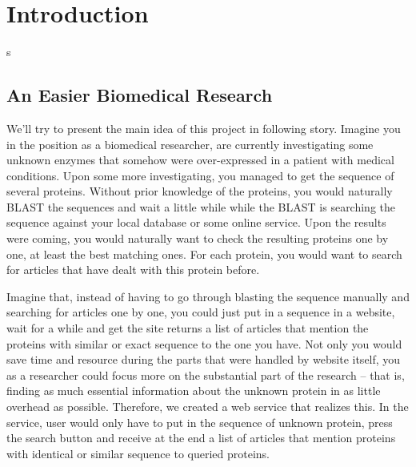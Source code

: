 
\chapter{Introduction} %

\label{Chapter1} %
s


\section{An Easier Biomedical Research}

We'll try to present the main idea of this project in following story. Imagine you in the position as a biomedical researcher, are currently investigating some unknown enzymes that somehow were over-expressed in a patient with medical conditions. Upon some more investigating, you managed to get the sequence of several proteins. Without prior knowledge of the proteins, you would naturally BLAST the sequences and wait a little while while the BLAST is searching the sequence against your local database or some online service. Upon the results were coming, you would naturally want to check the resulting proteins one by one, at least the best matching ones. For each protein, you would want to search for articles that have dealt with this protein before.

Imagine that, instead of having to go through blasting the sequence manually and searching for articles one by one, you could just put in a sequence in a website, wait for a while and get the site returns a list of articles that mention the proteins with similar or exact sequence to the one you have. Not only you would save time and resource during the parts that were handled by website itself, you as a researcher could focus more on the substantial part of the research -- that is, finding as much essential information about the unknown protein in as little overhead as possible. Therefore, we created a web service that realizes this. In the service, user would only have to put in the sequence of unknown protein, press the search button and receive at the end a list of articles that mention proteins with identical or similar sequence to queried proteins.

